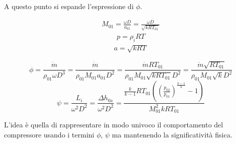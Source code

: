 A questo punto si espande l'espressione di $\phi$.
\begin{multicols}{3}
\begin{align*}
M_{01}=\frac{\omega D}{a_{01}}= \frac{\omega D}{\sqrt{k R T_{01}}}
\end{align*}
\begin{align*}
p = \rho_i RT
\end{align*}
\begin{align*}
a = \sqrt{k R T}
\end{align*}
\end{multicols}
\begin{equation}
\phi = \frac{\dot{m}}{\rho_{01} \omega D^3} = \frac{\dot{m}}{\rho_{01} M_{01} a_{01} D^2} = \frac{\dot{m} R T_{01}}{\rho_{01} M_{01} \sqrt{k R T_{01}} D^2} = \frac{\dot{m} \sqrt{R T_{01}}}{\rho_{01} M_{01} \sqrt{k} D^2}
\end{equation}
\begin{equation}
\psi = \frac{L_i}{\omega^2 D^2} = \frac{\Delta h_{0s}}{\omega^ 2 D^2} = \frac{\frac{k}{k-1} R T_{01}\left((\frac{p_{02}}{p_01})^{\frac{k-1}{k}}-1\right)}{M_{01}^2 k R T_{01}}
\end{equation}

L'idea è quella di rappresentare in modo univoco il comportamento del compressore usando i termini $\phi$, $\psi$ ma mantenendo la significatività fisica.

